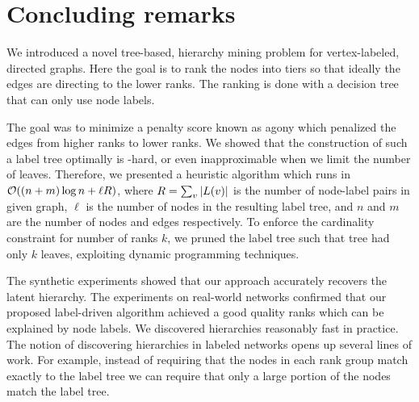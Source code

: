\section{Concluding remarks}\label{sec:conclusions}

We introduced a novel tree-based, hierarchy mining problem for vertex-labeled,
directed graphs. Here the goal is to rank the nodes into tiers so that
ideally the edges are directing to the lower ranks. The ranking is done with
a decision tree that can only use node labels.





The goal was to minimize a penalty score known as agony which penalized the edges from higher ranks to lower ranks.
We showed that the construction of such a label tree optimally is \np-hard, or even inapproximable when we limit the number of leaves.
Therefore, we presented a heuristic algorithm which runs in  $\bigO{(n + m)
\log n + \ell R}$, where $R = \sum_v {\left|L(v)\right|}$ is the number of node-label
pairs in given graph, $\ell$ is the number of nodes in the resulting label
tree, and $n$ and $m$ are the number of nodes and edges respectively.  To
enforce the cardinality constraint for number of ranks $k$, we pruned the label
tree such that tree had only $k$ leaves, exploiting dynamic programming
techniques.

The synthetic experiments showed that our approach accurately recovers the
latent hierarchy. The experiments on  real-world networks confirmed that our
proposed label-driven algorithm achieved a good quality ranks
which can be explained by node labels. We discovered
hierarchies reasonably fast in practice. The notion of discovering hierarchies
in labeled networks opens up several lines of work. For example, 
instead of requiring that the nodes in each rank group match exactly to the
label tree we can require that only a large portion of the nodes match the label tree.



